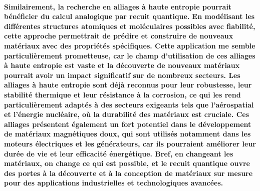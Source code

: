 \documentclass[12pt]{article}
\begin{document}
\paragraph{\normalfont Similairement, la recherche en alliages à haute entropie pourrait bénéficier du calcul analogique par recuit quantique. En modélisant les différentes structures atomiques et moléculaires possibles avec fiabilité, cette approche permettrait de prédire et construire de nouveaux matériaux avec des propriétés spécifiques. 
Cette application me semble particulièrement prometteuse, car le champ d'utilisation de ces alliages à haute entropie est vaste et la découverte de nouveaux matériaux pourrait avoir un impact significatif sur de nombreux secteurs. Les alliages à haute entropie sont déjà reconnus pour leur robustesse, leur stabilité thermique et leur résistance à la corrosion, ce qui les rend particulièrement adaptés à des secteurs exigeants tels que l'aérospatial 
et l'énergie nucléaire, où la durabilité des matériaux est cruciale. Ces alliages présentent également un fort potentiel dans le développement de matériaux magnétiques doux, qui sont utilisés notamment dans les moteurs électriques et les générateurs, car ils pourraient améliorer leur durée de vie et leur efficacité énergétique. Bref, en changeant les matériaux, on change ce qui est possible, et le recuit quantique ouvre des portes à la découverte et 
à la conception de matériaux sur mesure pour des applications industrielles et technologiques avancées. }
\end{document}
